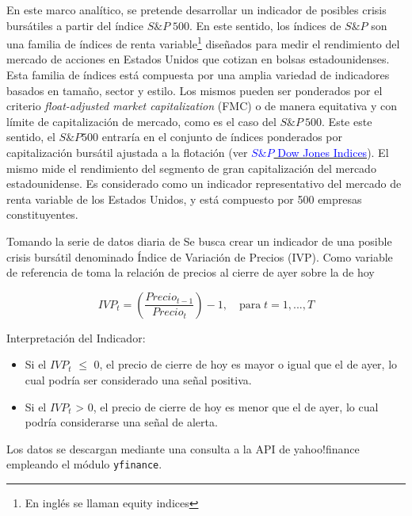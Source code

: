 \documentclass[
  12pt]{article}
\begin{document}
En este marco analítico, se pretende desarrollar un indicador de
posibles crisis bursátiles a partir del índice \(S\&P\;500\). En este
sentido, los índices de \(S\&P\) son una familia de índices de renta
variable\footnote{En inglés se llaman equity indices} diseñados para
medir el rendimiento del mercado de acciones en Estados Unidos que
cotizan en bolsas estadounidenses. Esta familia de índices está
compuesta por una amplia variedad de indicadores basados en tamaño,
sector y estilo. Los mismos pueden ser ponderados por el criterio
\textit{float-adjusted market capitalization} (FMC) o de manera
equitativa y con límite de capitalización de mercado, como es el caso
del \(S\&P\:500\). Este este sentido, el \(S\&P 500\) entraría en el
conjunto de índices ponderados por capitalización bursátil ajustada a la
flotación (ver
\href{https://www.spglobal.com/spdji/en/methodology/article/sp-us-indices-methodology/}{\textcolor{blue}{$S\&P$ Dow Jones Indices}}).
El mismo mide el rendimiento del segmento de gran capitalización del
mercado estadounidense. Es considerado como un indicador representativo
del mercado de renta variable de los Estados Unidos, y está compuesto
por 500 empresas constituyentes.

Tomando la serie de datos diaria de Se busca crear un indicador de una
posible crisis bursátil denominado Índice de Variación de Precios (IVP).
Como variable de referencia de toma la relación de precios al cierre de
ayer sobre la de hoy

\begin{equation}
IVP_t=\left (\frac{Precio_{t-1}}{Precio_t}\right ) -1,\quad\text{para}\; t=1,...,T 
\end{equation} \vspace{0.5cm}

Interpretación del Indicador:

\begin{itemize}
\item Si el $IVP_t$    $\leq$ 0, el precio de cierre de hoy es mayor o igual que el de ayer, lo cual podría ser considerado una señal positiva.
\item Si el $IVP_t$ > 0, el precio de cierre de hoy es menor que el de ayer, lo cual podría considerarse una señal de alerta.
\end{itemize}

Los datos se descargan mediante una consulta a la API de yahoo!finance
empleando el módulo \texttt{yfinance}.
\end{document}
